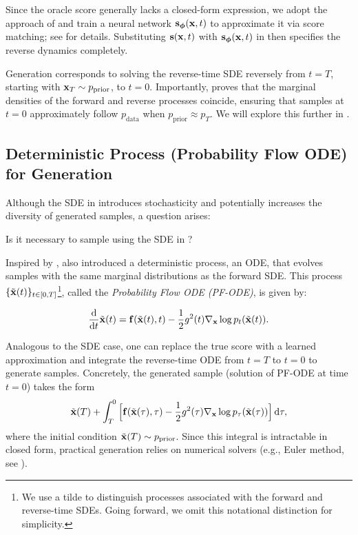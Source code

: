 Since the oracle score generally lacks a closed-form expression, we adopt the approach of  and train a neural network $\mathbf{s}_{\bm{\phi}}({\mathbf{x}}, t)$ to approximate it via score matching; see  for details. Substituting ${\mathbf{s}}({\mathbf{x}}, t)$ with $\mathbf{s}_{\bm{\phi}}({\mathbf{x}}, t)$ in  then specifies the reverse dynamics completely.

Generation corresponds to solving the reverse-time SDE reversely from $t = T$, starting with ${\mathbf{x}}_T \sim p_{\mathrm{prior}}$, to $t = 0$. Importantly, \citet{anderson1982reverse} proves that the marginal densities of the forward and reverse processes coincide, ensuring that samples at $t=0$ approximately follow $p_{\mathrm{data}}$ when $p_{\mathrm{prior}} \approx p_T$. We will explore this further in .






\subsection{Deterministic Process (Probability Flow ODE)  for Generation}\label{subsec:pf-ode}
 Although the SDE in  introduces stochasticity and potentially increases the diversity of generated samples, a question arises:
\begin{question}
    Is it necessary to sample using the SDE in ?
\end{question}

Inspired by \citet{maoutsa2020interacting}, \citet{song2020score} also introduced a deterministic process, an ODE, that evolves samples with the same marginal distributions as the forward SDE. This process $\{\tilde{{\mathbf{x}}}(t)\}_{t\in[0,T]}$\footnote{We use a tilde to distinguish processes associated with the forward and reverse-time SDEs. Going forward, we omit this notational distinction for simplicity.}, called the \emph{Probability Flow ODE (PF-ODE)}, is given by:
\begin{mdframed}
    \begin{equation}\label{eq:prob_ode_gt}
    \frac{\mathop{}\!\mathrm{d}}{\mathop{}\!\mathrm{d} t}\tilde{{\mathbf{x}}}(t) = \mathbf{f}(\tilde{{\mathbf{x}}}(t), t) - \frac{1}{2} g^2(t) \nabla_{{\mathbf{x}}} \log p_t(\tilde{{\mathbf{x}}}(t)).
    \end{equation}
\end{mdframed}

Analogous to the SDE case, one can replace the true score with a learned approximation and integrate the reverse-time ODE from $t = T$ to $t = 0$ to generate samples. Concretely, the generated sample (solution of PF-ODE at time $t=0$) takes the form
\[
\tilde{{\mathbf{x}}}(T) + \int_{T}^{0} \Big[ \mathbf{f}(\tilde{{\mathbf{x}}}(\tau), \tau) - \frac{1}{2} g^2(\tau)  \nabla_{{\mathbf{x}}} \log p_\tau(\tilde{{\mathbf{x}}}(\tau)) \Big]   \mathop{}\!\mathrm{d} \tau,
\]
where the initial condition $\tilde{{\mathbf{x}}}(T) \sim p_{\mathrm{prior}}$. Since this integral is intractable in closed form, practical generation relies on numerical solvers (e.g., Euler method, see ).


